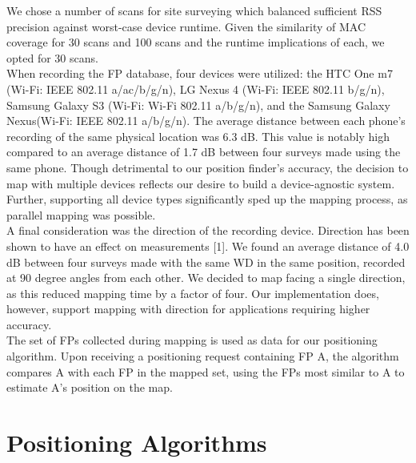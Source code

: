 \documentclass[conference]{IEEEtran}
\begin{document}
\indent We chose a number of scans for site surveying which balanced sufficient RSS precision against worst-case device runtime. Given the similarity of MAC coverage for 30 scans and 100 scans and the runtime implications of each, we opted for 30 scans.\\
\indent When recording the FP database, four devices were utilized: the HTC One m7 (Wi-Fi: IEEE 802.11 a/ac/b/g/n), LG Nexus 4  (Wi-Fi: IEEE 802.11 b/g/n), Samsung Galaxy S3 (Wi-Fi: Wi-Fi 802.11 a/b/g/n), and the Samsung Galaxy Nexus(Wi-Fi: IEEE 802.11 a/b/g/n). The average distance between each phone's recording of the same physical location was 6.3 dB. This value is notably high compared to an average distance of 1.7 dB between four surveys made using the same phone. Though detrimental to our position finder's accuracy, the decision to map with multiple devices reflects our desire to build a device-agnostic system. Further, supporting all device types significantly sped up the mapping process, as parallel mapping was possible.\\
\indent A final consideration was the direction of the recording device. Direction has been shown to have an effect on measurements [1]. We found an average distance of 4.0 dB between four surveys made with the same WD in the same position, recorded at 90 degree angles from each other. We decided to map facing a single direction, as this reduced mapping time by a factor of four. Our implementation does, however, support mapping with direction for applications requiring higher accuracy.\\
\indent The set of FPs collected during mapping is used as data for our positioning algorithm. Upon receiving a positioning request containing FP A, the algorithm compares A with each FP in the mapped set, using the FPs most similar to A to estimate A's position on the map.

\section{Positioning Algorithms}
\end{document}
